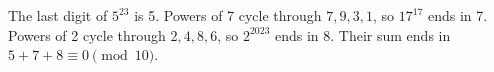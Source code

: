 The last digit of $5^{23}$ is 5. Powers of 7 cycle through $7,9,3,1$, so $17^{17}$ ends in 7. Powers of 2 cycle through $2,4,8,6$, so $2^{2023}$ ends in 8. Their sum ends in $5+7+8\equiv\boxed0\pmod{10}$.
